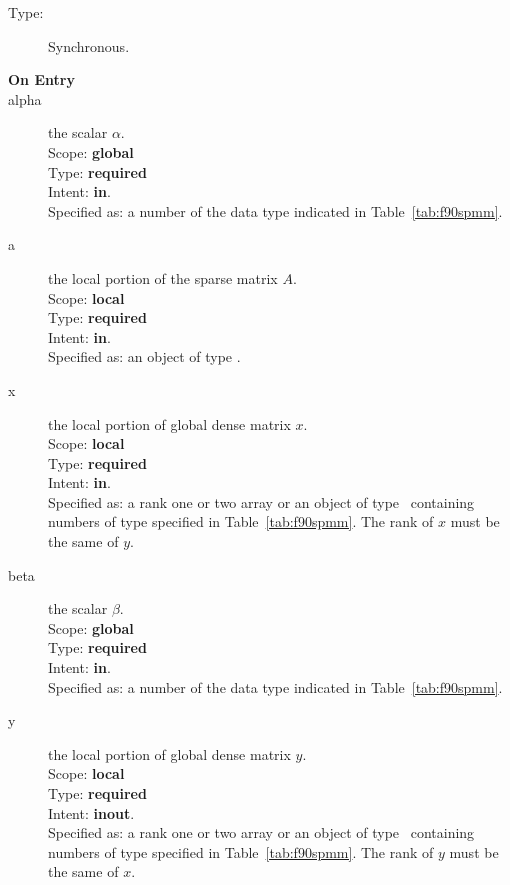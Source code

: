 \begin{description}
\item[Type:] Synchronous.
\item[\bf On Entry]
\item[alpha] the scalar $\alpha$.\\
Scope: {\bf global} \\
Type: {\bf required}\\
Intent: {\bf in}.\\
Specified as: a number of the data type indicated in
Table~\ref{tab:f90spmm}. 
\item[a] the local portion of the sparse matrix
$A$. \\ 
Scope: {\bf local} \\
Type: {\bf required}\\
Intent: {\bf in}.\\
Specified as: an object of type \spdata.
\item[x] the local portion of global dense matrix
$x$. %
\\
Scope: {\bf local} \\
Type: {\bf required} \\
Intent: {\bf in}.\\
Specified as:  a rank one or two array or an object of type \vdata\ 
containing numbers of type specified in
Table~\ref{tab:f90spmm}.  The rank of $x$ must be the same of $y$. 
\item[beta] the scalar $\beta$.\\
Scope: {\bf global} \\
Type: {\bf required} \\
Intent: {\bf in}.\\
Specified as: a number of the data type indicated in Table~\ref{tab:f90spmm}.
\item[y] the local portion of global dense matrix
$y$. %
\\
Scope: {\bf local} \\
Type: {\bf required} \\
Intent: {\bf inout}.\\
Specified as:  a rank one or two array or an object of type \vdata\ 
containing numbers of type specified in
Table~\ref{tab:f90spmm}. The rank of $y$ must be the same of $x$. 

\end{description}
